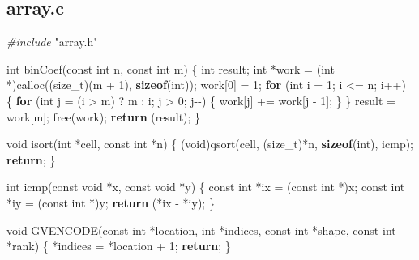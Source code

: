 \documentclass[
  12pt,
]{article}
\newenvironment{Shaded}{\begin{snugshade}}{\end{snugshade}}
\newcommand{\ControlFlowTok}[1]{\textcolor[rgb]{0.13,0.29,0.53}{\textbf{#1}}}
\newcommand{\DataTypeTok}[1]{\textcolor[rgb]{0.13,0.29,0.53}{#1}}
\newcommand{\DecValTok}[1]{\textcolor[rgb]{0.00,0.00,0.81}{#1}}
\newcommand{\ImportTok}[1]{#1}
\newcommand{\KeywordTok}[1]{\textcolor[rgb]{0.13,0.29,0.53}{\textbf{#1}}}
\newcommand{\NormalTok}[1]{#1}
\newcommand{\PreprocessorTok}[1]{\textcolor[rgb]{0.56,0.35,0.01}{\textit{#1}}}
\begin{document}
\hypertarget{array.c}{%
\subsection{array.c}\label{array.c}}

\begin{Shaded}
\begin{Highlighting}[]
\PreprocessorTok{\#include }\ImportTok{"array.h"}

\DataTypeTok{int}\NormalTok{ binCoef(}\DataTypeTok{const} \DataTypeTok{int}\NormalTok{ n, }\DataTypeTok{const} \DataTypeTok{int}\NormalTok{ m) \{}
  \DataTypeTok{int}\NormalTok{ result;}
  \DataTypeTok{int}\NormalTok{ *work = (}\DataTypeTok{int}\NormalTok{ *)calloc((}\DataTypeTok{size\_t}\NormalTok{)(m + }\DecValTok{1}\NormalTok{), }\KeywordTok{sizeof}\NormalTok{(}\DataTypeTok{int}\NormalTok{));}
\NormalTok{  work[}\DecValTok{0}\NormalTok{] = }\DecValTok{1}\NormalTok{;}
  \ControlFlowTok{for}\NormalTok{ (}\DataTypeTok{int}\NormalTok{ i = }\DecValTok{1}\NormalTok{; i \textless{}= n; i++) \{}
    \ControlFlowTok{for}\NormalTok{ (}\DataTypeTok{int}\NormalTok{ j = (i \textgreater{} m) ? m : i; j \textgreater{} }\DecValTok{0}\NormalTok{; j{-}{-}) \{}
\NormalTok{      work[j] += work[j {-} }\DecValTok{1}\NormalTok{];}
\NormalTok{    \}}
\NormalTok{  \}}
\NormalTok{  result = work[m];}
\NormalTok{  free(work);}
  \ControlFlowTok{return}\NormalTok{ (result);}
\NormalTok{\}}

\DataTypeTok{void}\NormalTok{ isort(}\DataTypeTok{int}\NormalTok{ *cell, }\DataTypeTok{const} \DataTypeTok{int}\NormalTok{ *n) \{}
\NormalTok{  (}\DataTypeTok{void}\NormalTok{)qsort(cell, (}\DataTypeTok{size\_t}\NormalTok{)*n, }\KeywordTok{sizeof}\NormalTok{(}\DataTypeTok{int}\NormalTok{), icmp);}
  \ControlFlowTok{return}\NormalTok{;}
\NormalTok{\}}

\DataTypeTok{int}\NormalTok{ icmp(}\DataTypeTok{const} \DataTypeTok{void}\NormalTok{ *x, }\DataTypeTok{const} \DataTypeTok{void}\NormalTok{ *y) \{}
  \DataTypeTok{const} \DataTypeTok{int}\NormalTok{ *ix = (}\DataTypeTok{const} \DataTypeTok{int}\NormalTok{ *)x;}
  \DataTypeTok{const} \DataTypeTok{int}\NormalTok{ *iy = (}\DataTypeTok{const} \DataTypeTok{int}\NormalTok{ *)y;}
  \ControlFlowTok{return}\NormalTok{ (*ix {-} *iy);}
\NormalTok{\}}

\DataTypeTok{void}\NormalTok{ GVENCODE(}\DataTypeTok{const} \DataTypeTok{int}\NormalTok{ *location, }\DataTypeTok{int}\NormalTok{ *indices, }\DataTypeTok{const} \DataTypeTok{int}\NormalTok{ *shape,}
              \DataTypeTok{const} \DataTypeTok{int}\NormalTok{ *rank) \{}
\NormalTok{  *indices = *location + }\DecValTok{1}\NormalTok{;}
  \ControlFlowTok{return}\NormalTok{;}
\NormalTok{\}}


\end{Highlighting}
\end{Shaded}
\end{document}
